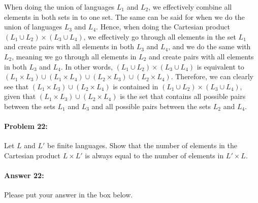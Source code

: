 \documentclass[10pt]{article}
\newenvironment{AnswerBox}{\begin{mdframed}[style=simple]}{\end{mdframed}}
\begin{document}
\begin{AnswerBox}%


  When doing the union of languages $L_1$ and $L_2$, we effectively combine all elements in both sets in to one set. The same can be said for when we do the union of languages $L_3$ and $L_4$. Hence, when doing the Cartesian product $(L_1 \cup L_2) \times (L_3 \cup L_4)$, we effectively go through all elements in the set $L_1$ and create pairs with all elements in both $L_3$ and $L_4$, and we do the same with $L_2$, meaning we go through all elements in $L_2$ and create pairs with all elements in both $L_3$ and $L_4$. In other words, $(L_1 \cup L_2) \times (L_3 \cup L_4)$ is equivalent to $(L_1 \times L_3) \cup (L_1 \times L_4) \cup (L_2 \times L_3) \cup (L_2 \times L_4) $. Therefore, we can clearly see that $(L_1 \times L_3) \cup (L_2 \times L_4)$ is contained in $(L_1 \cup L_2) \times (L_3 \cup L_4)$, given that $(L_1 \times L_3) \cup (L_2 \times L_4)$ is the set that contains all possible pairs between the sets $L_1$ and $L_3$ and all possible pairs between the sets $L_2$ and $L_4$.

\end{AnswerBox}%

\noindent\hrulefill %

\paragraph{Problem 22:}
Let $L$ and $L'$ be finite languages. Show that the number of elements in the
Cartesian product $L \times L'$ is always equal to the number of elements in $L'
\times L$.

\paragraph{Answer 22:} Please put your answer in the box below.
\end{document}
